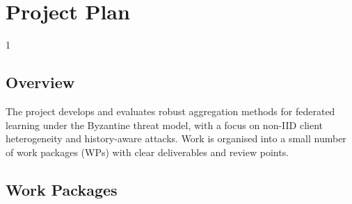 \doublespacing %

\chapter{Project Plan}
\label{chPlan}

\begin{spacing}{1} %
\minitoc %
\end{spacing} %
\thesisspacing %

\section{Overview}

The project develops and evaluates robust aggregation methods for federated learning under the Byzantine threat model, with a focus on non-IID client heterogeneity and history-aware attacks. Work is organised into a small number of work packages (WPs) with clear deliverables and review points.

\section{Work Packages}

